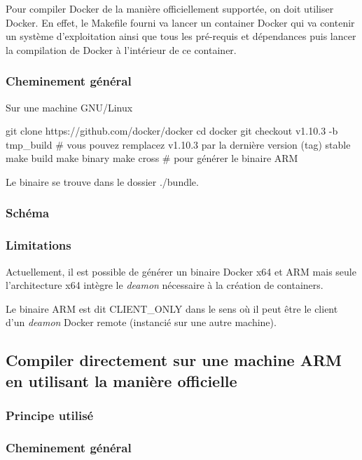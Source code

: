 \documentclass[11pt,a4paper]{article}
\begin{document}
Pour compiler Docker de la manière officiellement supportée, on doit utiliser Docker. En effet, le Makefile fourni va lancer un container Docker qui va contenir un système d'exploitation ainsi que tous les pré-requis et dépendances puis lancer la compilation de Docker à l'intérieur de ce container.

\subsubsection{Cheminement général}

Sur une machine GNU/Linux

\begin{bashcode}
git clone https://github.com/docker/docker
cd docker
git checkout v1.10.3 -b tmp_build # vous pouvez remplacez v1.10.3 par la dernière version (tag) stable
make build
make binary
make cross # pour générer le binaire ARM
\end{bashcode}

Le binaire se trouve dans le dossier ./bundle.

\subsubsection{Schéma}

\subsubsection{Limitations}

Actuellement, il est possible de générer un binaire Docker x64 et ARM mais seule l'architecture x64 intègre le \emph{deamon} nécessaire à la création de containers.

Le binaire ARM est dit CLIENT\_ONLY dans le sens où il peut être le client d'un \emph{deamon} Docker remote (instancié sur une autre machine).



\subsection{Compiler directement sur une machine ARM en utilisant la manière officielle}

\subsubsection{Principe utilisé}

\subsubsection{Cheminement général}
\end{document}
